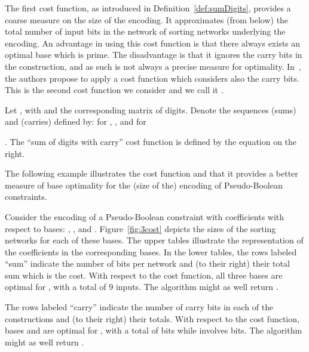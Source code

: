 \documentclass[envcountsame]{llncs}
\begin{document}
The first cost function,  as introduced in
Definition~\ref{def:sumDigits}, provides a coarse measure on the size
of the encoding.  It approximates (from below) the total number of
input bits in the network of sorting networks underlying the
encoding. An advantage in using this cost function is that there always
exists an optimal base which is prime. The disadvantage is that it
ignores the carry bits in the construction, and as such is not always
a precise measure for optimality.
In~\cite{EenS06}, the authors propose to apply a cost function which
considers also the carry bits. This is the second cost function we
consider and we call it  .

\begin{definition}
\label{cost2}
Let ,  with  and
 the corresponding  matrix of digits.
Denote the sequences  (sums) and 
 (carries) defined by: 
 for , , and 
 for\\
\begin{minipage}[t]{0.5\linewidth}
.
The ``sum of digits with carry''
cost function is defined by the equation on the right.
\end{minipage}\quad
\begin{minipage}[t]{0.5\linewidth}
\vspace{-6mm}

\end{minipage}
\end{definition}


The following example illustrates the  cost function and
that it provides a better measure of base optimality for the (size of
the) encoding of Pseudo-Boolean constraints.

           
\begin{example}\label{runningD}

  Consider the encoding of a Pseudo-Boolean constraint with
  coefficients  with respect to  bases: , , and
  .
Figure~\ref{fig:3cost} depicts the sizes of the sorting networks for
  each of these bases.  The upper tables  illustrate the representation of the coefficients in the
  corresponding bases. 
In the lower tables, the rows labeled ``sum'' indicate the
  number of bits per network and (to their right) their total sum which
  is the  cost.
With respect to the  cost function, all three bases are
  optimal for , with a total of 9 inputs. The algorithm might as
  well return .

  The rows labeled ``carry'' indicate the number of carry bits in each
  of the constructions and (to their right) their totals. With respect
  to the  cost function, bases  and  are optimal
  for , with a total of  bits while  involves 
  bits. The algorithm might as well return .
\end{example}
\end{document}
